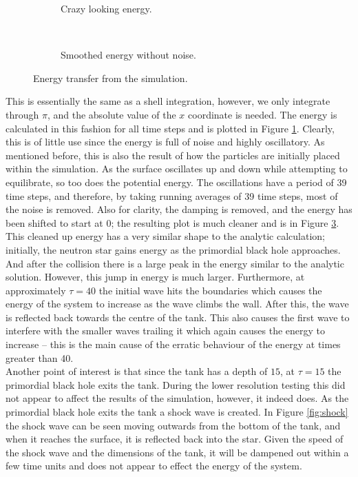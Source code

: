 \begin{figure}
\centering
\begin{subfigure}{\textwidth}

\caption{Crazy looking energy.}
\label{fig:badenergy}
\end{subfigure} \\
\begin{subfigure}{\textwidth}

\caption{Smoothed energy without noise.}
\label{fig:goodenergy}
\end{subfigure}
\caption{Energy transfer from the simulation.}
\end{figure}

This is essentially the same as a shell integration, however, we only integrate through $\pi$, and the absolute value of the $x$ coordinate is needed. The energy is calculated in this fashion for all time steps and is plotted in Figure \ref{fig:badenergy}. Clearly, this is of little use since the energy is full of noise and highly oscillatory. As mentioned before, this is also the result of how the particles are initially placed within the simulation. As the surface oscillates up and down while attempting to equilibrate, so too does the potential energy. The oscillations have a period of 39 time steps, and therefore, by taking running averages of 39 time steps, most of the noise is removed. Also for clarity, the damping is removed, and the energy has been shifted to start at 0; the resulting plot is much cleaner and is in Figure \ref{fig:goodenergy}. \\

This cleaned up energy has a very similar shape to the analytic calculation; initially, the neutron star gains energy as the primordial black hole approaches. And after the collision there is a large peak in the energy similar to the analytic solution. However, this jump in energy is much larger. Furthermore, at approximately $\tau = 40$ the initial wave hits the boundaries which causes the energy of the system to increase as the wave climbs the wall. After this, the wave is reflected back towards the centre of the tank. This also causes the first wave to interfere with the smaller waves trailing it which again causes the energy to increase -- this is the main cause of the erratic behaviour of the energy at times greater than 40. \\

Another point of interest is that since the tank has a depth of $15$, at $\tau = 15$ the primordial black hole exits the tank. During the lower resolution testing this did not appear to affect the results of the simulation, however, it indeed does. As the primordial black hole exits the tank a shock wave is created. In Figure \ref{fig:shock} the shock wave can be seen moving outwards from the bottom of the tank, and when it reaches the surface, it is reflected back into the star. Given the speed of the shock wave and the dimensions of the tank, it will be dampened out within a few time units and does not appear to effect the energy of the system.

